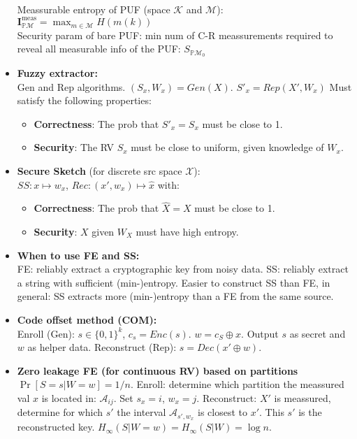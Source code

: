 \documentclass[twocolumn,9pt]{extarticle}
\begin{document}
\begin{itemize}
	Meassurable entropy of PUF (space $\mathcal{K}$ and $\mathcal{M}$):\\
	$\mathbf{I}^\text{meas}_{\mathbb{P}\mathcal{M}} = \max_{m\in\mathcal{M}} H(m(k))$\\

	Security param of bare PUF: min num of C-R meassurements required to reveal all measurable info of the PUF: $S_{\mathbb{P}\mathcal{M}_0}$

	\item \textbf{Fuzzy extractor: } \\
	Gen and Rep algorithms. $(S_x,W_x) = Gen(X)$. $S'_x = Rep(X', W_x)$
	Must satisfy the following properties:
	\begin{itemize}
		\item \textbf{Correctness}: The prob that $S'_x = S_x$ must be close to 1.
		\item \textbf{Security}: The RV $S_x$ must be close to uniform, given knowledge of $W_x$.
	\end{itemize}

	\item \textbf{Secure Sketch} (for discrete src space $\mathcal{X}$):\\
	$SS: x \mapsto w_x$, $Rec: (x', w_x) \mapsto \hat{x}$ with:
	\begin{itemize}
		\item \textbf{Correctness}: The prob that $\hat{X} = X$ must be close to 1.
		\item \textbf{Security}: $X$ given $W_X$ must have high entropy.
	\end{itemize}

	\item \textbf{When to use FE and SS: } \\
	FE: reliably extract a cryptographic key from noisy data. SS: reliably extract a string with sufficient (min-)entropy. Easier to construct SS than FE, in general: SS extracts more (min-)entropy than a FE from the same source.

	\item \textbf{Code offset method (COM):} \\
	Enroll (Gen): $s \in \{0,1\}^k$, $c_s = Enc(s)$. $w = c_S \oplus x$. Output $s$ as secret and $w$ as helper data.
	Reconstruct (Rep): $\hat{s} = Dec(x' \oplus w)$.


	\item \textbf{Zero leakage FE (for continuous RV) based on partitions } \\
	$\Pr[S=s|W=w] = 1/n$. Enroll: determine which partition the meassured val $x$ is located in: $\mathcal{A}_{ij}$. Set $s_x = i$, $w_x = j$. Reconstruct: $X'$ is meassured, determine for which $s'$ the interval $\mathcal{A}_{s',w_x}$ is closest to $x'$. This $s'$ is the reconstructed key. $H_\infty(S|W=w) = H_\infty(S|W) = \log n$.


\end{itemize}
\end{document}
